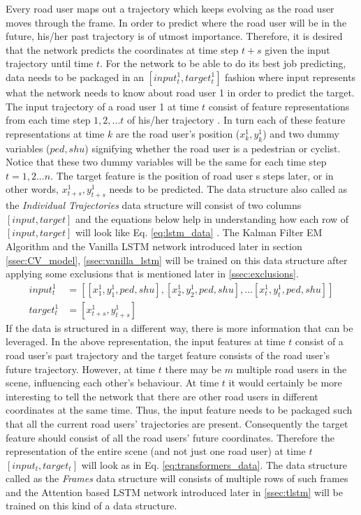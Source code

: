 \documentclass{article}
\begin{document}
Every road user maps out a trajectory which keeps evolving as the road user moves through the frame. In order to predict where the road user will be in the future, his/her past trajectory is of utmost importance. Therefore, it is desired that the network predicts the coordinates at time step $t+s$ given the input trajectory until time $t$. For the network to be able to do its best job predicting, data needs to be packaged in an $[input^{1}_t,target^{1}_t]$ fashion where input represents what the network needs to know about road user 1 in order to predict the target. The input trajectory of a road user 1 at time $t$ consist of feature representations from each time step $1,2,...t$  of his/her trajectory . In turn each of these feature representations at time $k$ are the road user's position ($x^1_k,y^1_k$) and two dummy variables ($ped,shu$) signifying whether the road user is a pedestrian or cyclist. Notice that these two dummy variables will be the same for each time step $t=1,2...n$. The target feature is the position of road user s steps later, or in other words, $x^{1}_{t+s},y^{1}_{t+s}$  needs to be predicted. The data structure also called as the \textit{Individual Trajectories} data structure will consist of two columns $[input,target]$ and the equations below help in understanding how each row of $[input,target]$ will look like Eq. \ref{eq:lstm_data} . The Kalman Filter EM Algorithm and the Vanilla LSTM network introduced later in section \ref{ssec:CV_model}, \ref{ssec:vanilla_lstm} will be trained on this data structure after applying some exclusions that is mentioned later in \ref{ssec:exclusions}. 
\begin{equation}\label{eq:lstm_data}
    \begin{split}
        input^{1}_t&=[[x^{1}_1,y^{1}_1,ped,shu],[x^{1}_2,y^{1}_2,ped,shu],...[x^{1}_t,y^{1}_t,ped,shu]]\\
        target^{1}_t&=[x^{1}_{t+s},y^{1}_{t+s}]
    \end{split}
\end{equation}
If the data is structured in a different way, there is more information that can be leveraged. In the above representation, the input features at time $t$ consist of a road user's past trajectory and the target feature consists of the road user's future trajectory. However, at  time $t$ there may be $m$ multiple road users in the scene, influencing each other's behaviour. At time $t$ it would certainly be more interesting to tell the network that there are other road users in different coordinates at the same time. Thus, the input feature needs to be packaged such that all the current road users' trajectories are present. Consequently the target feature should consist of all the road users' future coordinates. Therefore the representation of the entire scene (and not just one road user) at time $t$ $[input_t,target_t]$ will look as in Eq. \ref{eq:transformers_data}. The data structure called as the \textit{Frames} data structure will consists of multiple rows of such frames and the Attention based LSTM network introduced later in \ref{ssec:tlstm} will be trained on this kind of a data structure. 
\end{document}
